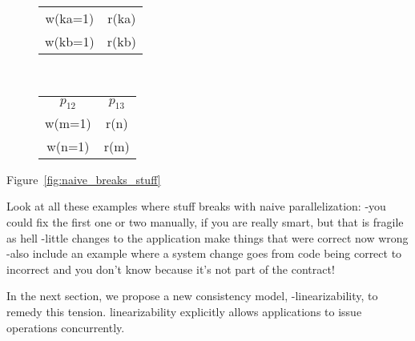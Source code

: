 \begin{figure*}
\begin{subfigure}[t]{.2\linewidth}
\begin{center}
\begin{tabular}{ c c }
 w(ka=1) & r(ka) \\  
 w(kb=1) & r(kb)    
\end{tabular}
\caption{}
\end{center}
\end{subfigure}
~
\begin{subfigure}[t]{.2\linewidth}
\begin{center}
\begin{tabular}{ c c }
 $p_{12}$ & $p_{13}$ \\
 w(m=1) & r(n) \\  
 w(n=1) & r(m)    
\end{tabular}
\caption{}
\end{center}
\end{subfigure}
\caption{}
\label{fig:naive_breaks_stuff}
\end{figure*}

Figure~\ref{fig:naive_breaks_stuff}

Look at all these examples where stuff breaks with naive parallelization:
-you could fix the first one or two manually, if you are really smart, but that is fragile as hell
-little changes to the application make things that were correct now wrong
-also include an example where a system change goes from code being correct to incorrect and you don't know because it's not part of the contract!



In the next section, we propose a new \multidispatch{} 
consistency model, \md{}-linearizability, to remedy this 
tension. \Multidispatch{} linearizability explicitly allows 
applications to issue operations concurrently.

